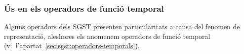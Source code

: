 







\subsubsection{Ús en els operadors de funció temporal}

Alguns operadors dels SGST presenten particularitats a causa del
fenomen de representació, aleshores els anomenem operadors de funció
temporal (v.\ l'apartat~\ref{sec:sgst:operadors-temporals}).

